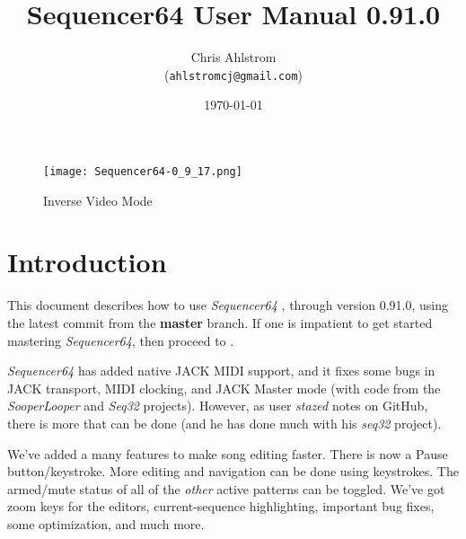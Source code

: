 \documentclass[
 11pt,
 twoside,
 a4paper,
 headinclude,
 footinclude,
 final                                 %
]{article}
\begin{document}
\title{Sequencer64 User Manual 0.91.0}
\author{Chris Ahlstrom \\
   (\texttt{ahlstromcj@gmail.com})}
\date{\today}
\maketitle

\begin{figure}[H]
   \centering 
   \texttt{[image: Sequencer64-0\_9\_17.png]}
   \caption*{Inverse Video Mode}
\end{figure}

\clearpage                             %

\tableofcontents
\listoffigures                         %
\listoftables                          %


\setlength{\parindent}{0pt}
\setlength{\parskip}{1ex plus 0.5ex minus 0.2ex}

\section{Introduction}
\label{sec:introduction}

   This document describes how to use \textsl{Sequencer64}
   \cite{sequencer64}, through version 0.91.0,
   using the latest commit from the \textbf{master} branch.
   If one is impatient to get started mastering \textsl{Sequencer64},
   then proceed to .

   \textsl{Sequencer64} has added native JACK MIDI support,
   and it fixes some bugs in JACK transport, MIDI clocking, and
   JACK Master mode (with code from the \textsl{SooperLooper} 
   and \textsl{Seq32} projects).
   However, as user \textsl{stazed} notes on GitHub, there is more that can be
   done (and he has done much with his \textsl{seq32} \cite{seq32} project).

   We've added a many features to make song editing faster.
   There is now a Pause button/keystroke.
   More editing and navigation can be done using keystrokes.
   The armed/mute status of all of the \textsl{other} active patterns can be
   toggled.
   We've got zoom keys for the editors, current-sequence highlighting,
   important bug fixes, some optimization, and much more.
\end{document}

